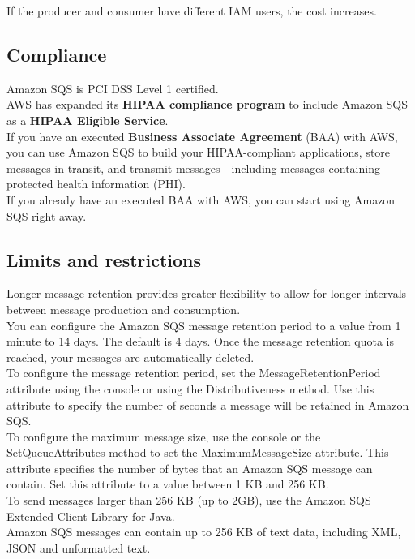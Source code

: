 \documentclass[12pt, letterpaper, twoside]{article}
\begin{document}
If the producer and consumer have different IAM users, the cost increases.\\

\subsection{Compliance}
Amazon SQS is PCI DSS Level 1 certified.\\
AWS has expanded its \textbf{HIPAA compliance program} to include Amazon SQS as a \textbf{HIPAA Eligible Service}.\\
If you have an executed \textbf{Business Associate Agreement} (BAA) with AWS, you can use Amazon SQS to build your 
HIPAA-compliant applications, store messages in transit, and transmit messages—including messages containing protected 
health information (PHI).\\
If you already have an executed BAA with AWS, you can start using Amazon SQS right away.\\

\subsection{Limits and restrictions}
Longer message retention provides greater flexibility to allow for longer intervals between message production and 
consumption.\\
You can configure the Amazon SQS message retention period to a value from 1 minute to 14 days. The default is 4 days. 
Once the message retention quota is reached, your messages are automatically deleted.\\

To configure the message retention period, set the MessageRetentionPeriod attribute using the console or using the 
Distributiveness method. Use this attribute to specify the number of seconds a message will be retained in Amazon SQS.\\

To configure the maximum message size, use the console or the SetQueueAttributes method to set the MaximumMessageSize 
attribute. This attribute specifies the number of bytes that an Amazon SQS message can contain. Set this attribute to 
a value between 1 KB and 256 KB.\\

To send messages larger than 256 KB (up to 2GB), use the Amazon SQS Extended Client Library for Java.\\	

Amazon SQS messages can contain up to 256 KB of text data, including XML, JSON and unformatted text.\\
\end{document}
